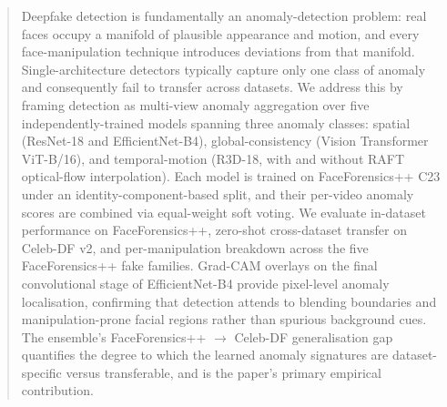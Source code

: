 


\begin{abstract}
Deepfake detection is fundamentally an anomaly-detection problem: real faces occupy a manifold of plausible appearance and motion, and every face-manipulation technique introduces deviations from that manifold. Single-architecture detectors typically capture only one class of anomaly and consequently fail to transfer across datasets. We address this by framing detection as multi-view anomaly aggregation over five independently-trained models spanning three anomaly classes: spatial (ResNet-18 and EfficientNet-B4), global-consistency (Vision Transformer ViT-B/16), and temporal-motion (R3D-18, with and without RAFT optical-flow interpolation). Each model is trained on FaceForensics++ C23 under an identity-component-based split, and their per-video anomaly scores are combined via equal-weight soft voting. We evaluate in-dataset performance on FaceForensics++, zero-shot cross-dataset transfer on Celeb-DF v2, and per-manipulation breakdown across the five FaceForensics++ fake families. Grad-CAM overlays on the final convolutional stage of EfficientNet-B4 provide pixel-level anomaly localisation, confirming that detection attends to blending boundaries and manipulation-prone facial regions rather than spurious background cues. The ensemble's FaceForensics++ \(\rightarrow\) Celeb-DF generalisation gap quantifies the degree to which the learned anomaly signatures are dataset-specific versus transferable, and is the paper's primary empirical contribution.
\end{abstract}




